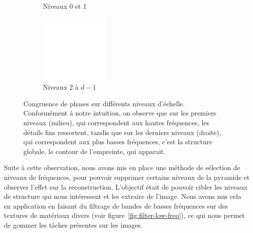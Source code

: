 \begin{figure}
\begin{subfigure}[b]{.25\textwidth}
        \caption{Niveaux 0 et 1}
    \end{subfigure}
    \hfill
    \begin{subfigure}[b]{.25\textwidth}
        \centering
        \includegraphics[width=\textwidth]{contenu/resources/images/pc_layer_2_depth-1}
        \caption{Niveaux 2 à $d-1$}
    \end{subfigure}

    \caption[Congruence de phases sur différents niveaux d'échelle]{Congruence de phases sur différents niveaux d'échelle. Conformément à notre intuition, on observe que sur les premiers niveaux (milieu), qui correspondent aux hautes fréquences, les détails fins ressortent, tandis que sur les derniers niveaux (droite), qui correspondent aux plus basses fréquences, c'est la structure globale, le contour de l'empreinte, qui apparait.}
    \label{fig:pc-selection-niveaux}
\end{figure}

Suite à cette observation, nous avons mis en place une méthode de sélection de niveaux de fréquences, pour pouvoir supprimer certains niveaux de la pyramide et observer l'effet sur la reconstruction. L'objectif était de pouvoir cibler les niveaux de structure qui nous intéressent et les extraire de l'image. Nous avons mis cela en application en faisant du filtrage de bandes de basses fréquences sur des textures de matériaux divers (voir figure~\ref{fig:filter-low-freq}), ce qui nous permet de gommer les tâches présentes sur les images.

